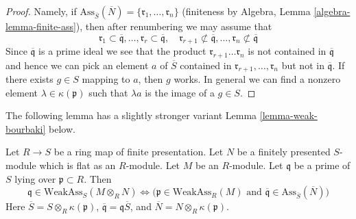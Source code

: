 \begin{proof}
Namely, if $\text{Ass}_{\overline{S}}(\overline{N}) =
\{\mathfrak r_1, \ldots, \mathfrak r_n\}$
(finiteness by Algebra, Lemma \ref{algebra-lemma-finite-ass}),
then after renumbering we may assume that
$$
\mathfrak r_1 \subset \overline{\mathfrak q},
\ldots,
\mathfrak r_r \subset \overline{\mathfrak q}, \quad
\mathfrak r_{r + 1} \not \subset \overline{\mathfrak q},
\ldots,
\mathfrak r_n \not \subset \overline{\mathfrak q}
$$
Since $\overline{\mathfrak q}$ is a prime ideal we see that the product
$\mathfrak r_{r + 1} \ldots \mathfrak r_n$ is not contained in
$\overline{\mathfrak q}$ and hence we can pick an element
$a$ of $\overline{S}$ contained in
$\mathfrak r_{r + 1}, \ldots, \mathfrak r_n$ but not in
$\overline{\mathfrak q}$.
If there exists $g \in S$ mapping to $a$, then $g$
works. In general we can find a nonzero element
$\lambda \in \kappa(\mathfrak p)$
such that $\lambda a$ is the image of a $g \in S$.
\end{proof}

\noindent
The following lemma has a slightly stronger variant
Lemma \ref{lemma-weak-bourbaki}
below.

\begin{lemma}
\label{lemma-weak-bourbaki-pre}
Let $R \to S$ be a ring map of finite presentation.
Let $N$ be a finitely presented $S$-module
which is flat as an $R$-module. Let $M$ be an $R$-module.
Let $\mathfrak q$ be a prime of $S$ lying over $\mathfrak p \subset R$.
Then
$$
\mathfrak q \in \text{WeakAss}_S(M \otimes_R N)
\Leftrightarrow
\Big(
\mathfrak p \in \text{WeakAss}_R(M)
\text{ and }
\overline{\mathfrak q} \in \text{Ass}_{\overline{S}}(\overline{N})
\Big)
$$
Here $\overline{S} = S \otimes_R \kappa(\mathfrak p)$,
$\overline{\mathfrak q} = \mathfrak q \overline{S}$, and
$\overline{N} = N \otimes_R \kappa(\mathfrak p)$.
\end{lemma}

